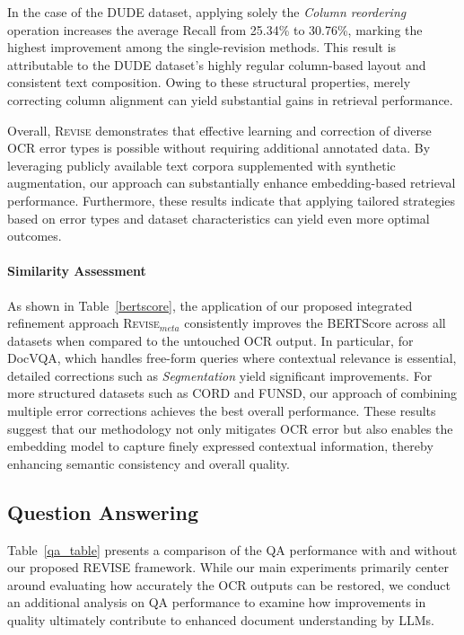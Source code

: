 In the case of the DUDE dataset, applying solely the \textit{Column reordering} operation increases the average Recall from 25.34\% to 30.76\%, marking the highest improvement among the single-revision methods. This result is attributable to the DUDE dataset's highly regular column-based layout and consistent text composition. Owing to these structural properties, merely correcting column alignment can yield substantial gains in retrieval performance.



Overall, \textsc{Revise} demonstrates that effective learning and correction of diverse OCR error types is possible without requiring additional annotated data. By leveraging publicly available text corpora supplemented with synthetic augmentation, our approach can substantially enhance embedding-based retrieval performance. Furthermore, these results indicate that applying tailored strategies based on error types and dataset characteristics can yield even more optimal outcomes.


\paragraph{Similarity Assessment}




As shown in Table~\ref{bertscore}, the application of our proposed integrated refinement approach \textsc{Revise}$_{meta}$ consistently improves the BERTScore across all datasets when compared to the untouched OCR output. In particular, for DocVQA, which handles free-form queries where contextual relevance is essential, detailed corrections such as \textit{Segmentation} yield significant improvements. For more structured datasets such as CORD and FUNSD, our approach of combining multiple error corrections achieves the best overall performance. These results suggest that our methodology not only mitigates OCR error but also enables the embedding model to capture finely expressed contextual information, thereby enhancing semantic consistency and overall quality. 





\subsection{Question Answering}



Table~\ref{qa_table} presents a comparison of the QA performance with and without our proposed REVISE framework. While our main experiments primarily center around evaluating how accurately the OCR outputs can be restored, we conduct an additional analysis on QA performance to examine how improvements in quality ultimately contribute to enhanced document understanding by LLMs.

